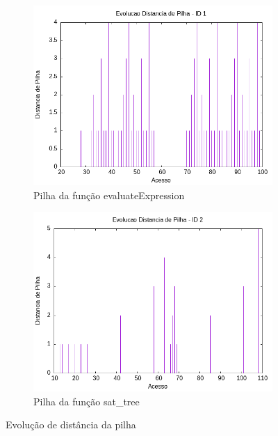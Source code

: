 \documentclass{article}
\begin{document}
\begin{figure}[H]
    \centering
    \hfill
    \begin{subfigure}[c]{0.4\textwidth}
        \centering
        \includegraphics[width=\textwidth]{./images/sat_tree/registro_s-distp-1.png}
        \caption{Pilha da função evaluateExpression}
        \label{fig:ac03}
    \end{subfigure}
    \hfill
    \begin{subfigure}[c]{0.4\textwidth}
        \centering
        \includegraphics[width=\textwidth]{./images/sat_tree/registro_s-distp-2.png}
        \caption{Pilha da função sat\_tree}
        \label{fig:ac04}
    \end{subfigure}
    \hfill
    \caption{Evolução de distância da pilha}
\end{figure}
\end{document}
